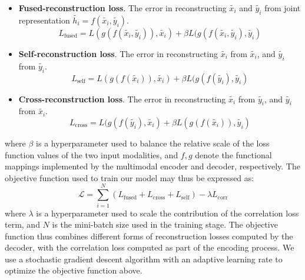 \documentclass[10pt,twocolumn,letterpaper]{article}
\begin{document}
\begin{itemize}
\item \textbf{Fused-reconstruction loss}. The error in reconstructing $\tilde{x_i}$ and $\tilde{y_i}$ from joint representation $\tilde{h_i} = f(\tilde{x_i}, \tilde{y_i})$.
$$ L_{\text{fused}} = L(g(f(\tilde{x_i}, \tilde{y_i})), \tilde{x_i}) + \beta L(g(f(\tilde{x_i}, \tilde{y_i}), \tilde{y_i})$$

\item \textbf{Self-reconstruction loss}. The error in reconstructing $\tilde{x_i}$ from $\tilde{x_i}$, and $\tilde{y_i}$ from $\tilde{y_i}$.
$$ L_{\text{self}} = L(g(f(\tilde{x_i})), \tilde{x_i}) + \beta L(g(f(\tilde{y_i}), \tilde{y_i})$$

\item \textbf{Cross-reconstruction loss}. The error in reconstructing $\tilde{x_i}$ from $\tilde{y_i}$, and $\tilde{y_i}$ from $\tilde{x_i}$.
$$ L_{\text{cross}} = L(g(f(\tilde{y_i}), \tilde{x_i}) + \beta L(g(f(\tilde{x_i})), \tilde{y_i})$$
\end{itemize}

\noindent where $\beta$ is a hyperparameter used to balance the relative scale of the loss function values of the two input modalities, and $f, g$ denote the functional mappings implemented by the multimodal encoder and decoder, respectively. The objective function used to train our model may thus be expressed as:
$$\mathcal{L}=\sum_{i=1}^N \left( L_{\text{fused}}+L_{\text{cross}}+L_{\text{self}}\right )-\lambda L_{\text{corr}} $$where $\lambda$ is a hyperparameter used to scale the contribution of the correlation loss term, and $N$ is the mini-batch size used in the training stage. The objective function thus combines different forms of reconstruction losses computed by the decoder, with the correlation loss computed as part of the encoding process.  We use a stochastic gradient descent algorithm with an adaptive learning rate to optimize the objective function above.
\end{document}
